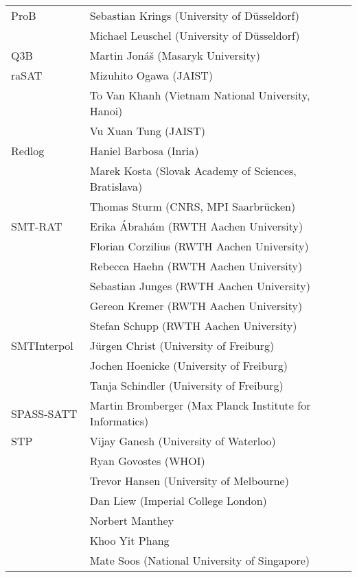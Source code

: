 \begin{longtable}{lp{11.5cm}}
  ProB~\cite{doi:10.1002/9781119002727.ch14}
  & Sebastian Krings (University of D\"usseldorf) \\
  & Michael Leuschel (University of D\"usseldorf)
  \\[1ex]

  Q3B
  & Martin Jon\'a\v{s} (Masaryk University)
  \\[1ex]

  raSAT~\cite{rasat}
  & Mizuhito Ogawa (JAIST) \\
  & To Van Khanh (Vietnam National University, Hanoi) \\
  & Vu Xuan Tung (JAIST)
  \\[1ex]

  Redlog~\cite{DBLP:journals/cca/Dolzmann097}
  & Haniel Barbosa (Inria) \\
  & Marek Kosta (Slovak Academy of Sciences, Bratislava)  \\
  & Thomas Sturm (CNRS, MPI Saarbr\"ucken)
  \\[1ex]

  SMT-RAT~\cite{DBLP:conf/sat/CorziliusKJSA15}
  & Erika \'Abrah\'am (RWTH Aachen University) \\
  & Florian Corzilius (RWTH Aachen University) \\
  & Rebecca Haehn (RWTH Aachen University) \\
  & Sebastian Junges (RWTH Aachen University) \\
  & Gereon Kremer (RWTH Aachen University) \\
  & Stefan Schupp (RWTH Aachen University)
  \\[1ex]

  SMTInterpol~\cite{DBLP:conf/spin/ChristHN12}
  & J\"urgen Christ (University of Freiburg) \\
  & Jochen Hoenicke (University of Freiburg) \\
  & Tanja Schindler (University of Freiburg)
  \\[1ex]

  SPASS-SATT
  & Martin Bromberger (Max Planck Institute for Informatics)
  \\[1ex]

  STP~\cite{ganesh07}
  & Vijay Ganesh (University of Waterloo) \\
  & Ryan Govostes (WHOI) \\
  & Trevor Hansen (University of Melbourne) \\
  & Dan Liew (Imperial College London) \\
  & Norbert Manthey \\
  & Khoo Yit Phang \\
  & Mate Soos (National University of Singapore)
  \\[1ex]


\end{longtable}

